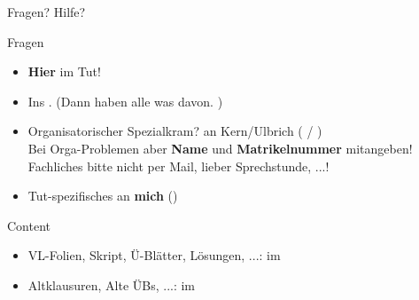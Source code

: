 \begin{frame}{Fragen? Hilfe?}	
	\begin{block}{Fragen}
		\begin{itemize}
			\item \textbf{Hier} im Tut!
			\item Ins \ILIAS. (Dann haben alle was davon. \smiley) \\
			\pause
			\item Organisatorischer Spezialkram? \impl an Kern/Ulbrich ( / ) \\
			Bei Orga-Problemen aber \textbf{Name} und \textbf{Matrikelnummer}  mitangeben! \\
			Fachliches bitte nicht per Mail, lieber \impl Sprechstunde, \ILIAS...!
			\item Tut-spezifisches an \textbf{mich} (\mailto{\mymail})
		\end{itemize}
	\end{block}
	\pause
	\begin{block}{Content}
		\begin{itemize}
			\item VL-Folien, Skript, Ü-Blätter, Lösungen, ...: im \ILIAS
			\item Altklausuren, Alte ÜBs, ...: im \ARCHIV\\
		\end{itemize}
	\end{block}
\end{frame}




